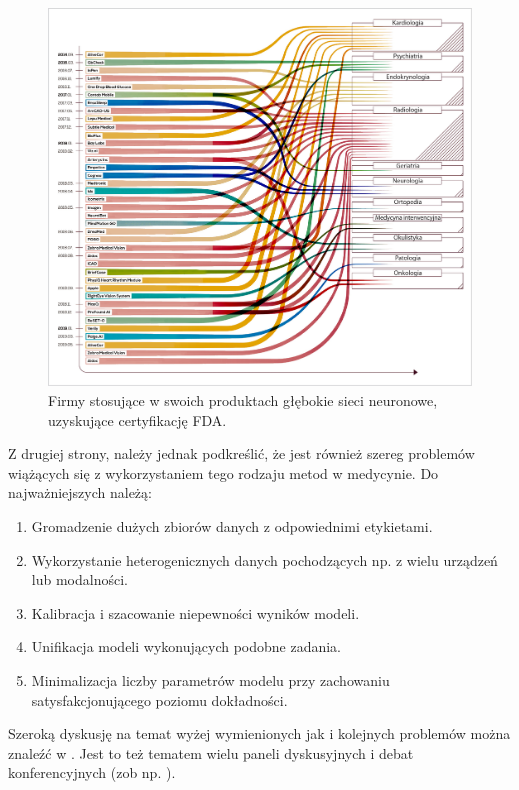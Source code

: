 \begin{figure}[h!]
	\centering
	\includegraphics[width=1\textwidth]{figures/fda_for_ai.jpg}
	\caption{Firmy stosujące w swoich produktach głębokie sieci neuronowe, uzyskujące certyfikację FDA.}
	\label{fda_cert}
\end{figure}

Z drugiej strony, należy jednak podkreślić, że jest również szereg problemów wiążących się z wykorzystaniem tego rodzaju metod w medycynie. Do najważniejszych należą:
\begin{enumerate}
	\item Gromadzenie dużych zbiorów danych z odpowiednimi etykietami.
	\item Wykorzystanie heterogenicznych danych pochodzących np. z wielu urządzeń lub modalności.
	\item Kalibracja i szacowanie niepewności wyników modeli.
	\item Unifikacja modeli wykonujących podobne zadania.
	\item Minimalizacja liczby parametrów modelu przy zachowaniu satysfakcjonującego poziomu dokładności.
\end{enumerate}
Szeroką dyskusję na temat wyżej wymienionych jak i kolejnych problemów można znaleźć w \cite{Marcus2018}. Jest to też tematem wielu paneli dyskusyjnych i debat konferencyjnych (zob np. \cite{NVIDIApanel}). 

